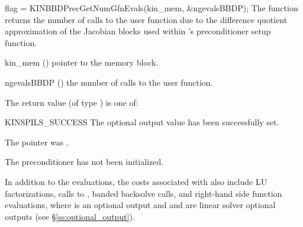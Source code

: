 {
  flag = KINBBDPrecGetNumGfnEvals(kin\_mem, \&ngevalsBBDP);
}
{
  The function  returns the
  number of calls to the user  function due to the 
  difference quotient approximation of the Jacobian blocks used within
  {\kinbbdpre}'s preconditioner setup function.
}
{
  \begin{args}[ngevalsBBDP]
  \item[kin\_mem] ()
    pointer to the {\kinsol} memory block.
  \item[ngevalsBBDP] ()
    the number of calls to the user  function.
  \end{args}
}
{
  The return value  (of type ) is one of:
  \begin{args}
  \item[KINSPILS\_SUCCESS] 
    The optional output value has been successfully set.
  \item[\id{KINSPILS\_MEM\_NULL}] 
    The  pointer was .
  \item[\Id{KINSPILS\_PMEM\_NULL}]
    The {\kinbbdpre} preconditioner has not been initialized.
  \end{args}
}
{}


In addition to the   evaluations,
the costs associated with {\kinbbdpre} also include  LU
factorizations,  calls to ,  banded
backsolve calls, and  right-hand side function evaluations,
where  is an optional {\kinsol} output and  and 
 are linear solver optional outputs (see \S\ref{ss:optional_output}).
